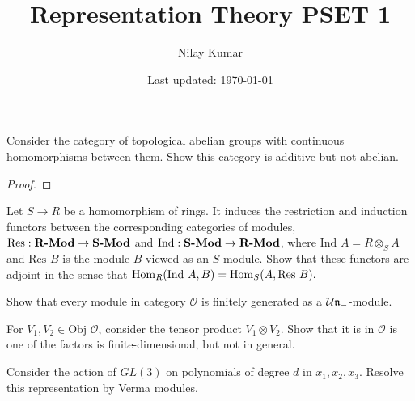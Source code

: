 \documentclass{../../mathnotes}
\title{Representation Theory PSET 1}
\author{Nilay Kumar}
\date{Last updated: \today}
\begin{document}
\maketitle

\begin{prop}
    Consider the category of topological abelian groups with continuous homomorphisms
    between them. Show this category is additive but not abelian.
\end{prop}
\begin{proof}
    
\end{proof}



\begin{prop}
    Let $S\to R$ be a homomorphism of rings. It induces the restriction and induction
    functors between the corresponding categories of modules, $\text{Res}:{ \normalfont\textbf{R-Mod}}\to{ \normalfont\textbf{S-Mod}}$
    and $\text{Ind}:{ \normalfont\textbf{S-Mod}}\to{ \normalfont\textbf{R-Mod}}$, where $\text{Ind }A=R\otimes_S A$ and $\text{Res }B$
    is the module $B$ viewed as an $S$-module. Show that these functors are adjoint in the
    sense that $\operatorname{Hom}_R(\text{Ind } A,B)=\operatorname{Hom}_S(A,\text{Res }B).$
\end{prop}

\begin{prop}
    Show that every module in category $\mathcal{O}$ is finitely generated as a
    $\mathcal{U}\mathfrak n_{-}$-module.
\end{prop}

\begin{prop}
    For $V_1,V_2\in\text{Obj }\mathcal{O}$, consider the tensor product $V_1\otimes V_2$.
    Show that it is in $\mathcal{O}$ is one of the factors is finite-dimensional, but
    not in general.
\end{prop}

\begin{prop}
    Consider the action of $GL(3)$ on polynomials of degree $d$ in $x_1,x_2,x_3$.
    Resolve this representation by Verma modules.
\end{prop}
\end{document}
